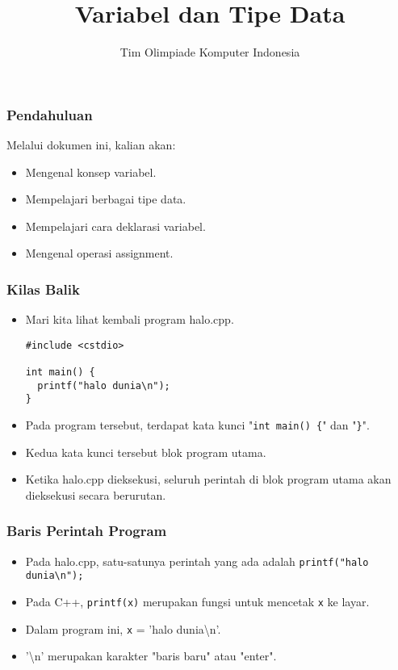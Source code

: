 

\title{Variabel dan Tipe Data}
\author{Tim Olimpiade Komputer Indonesia}
\date{}



\begin{frame}
\titlepage
\end{frame}

\begin{frame}
\frametitle{Pendahuluan}
Melalui dokumen ini, kalian akan:
\begin{itemize}
  \item Mengenal konsep variabel.
  \item Mempelajari berbagai tipe data.
  \item Mempelajari cara deklarasi variabel.
  \item Mengenal operasi assignment.
\end{itemize}
\end{frame}

\begin{frame}[fragile]
\frametitle{Kilas Balik}
\begin{itemize}
  \item Mari kita lihat kembali program halo.cpp.
  \begin{lstlisting}
#include <cstdio>

int main() {
  printf("halo dunia\n");
}\end{lstlisting}
  \item Pada program tersebut, terdapat kata kunci "\texttt{int main() \{}" dan "\texttt{\}}".
  \item Kedua kata kunci tersebut blok program utama.
  \item Ketika halo.cpp dieksekusi, seluruh perintah di blok program utama akan dieksekusi secara berurutan.
\end{itemize}
\end{frame}

\begin{frame}
\frametitle{Baris Perintah Program}
\begin{itemize}
  \item Pada halo.cpp, satu-satunya perintah yang ada adalah \texttt{printf("halo dunia\textbackslash n");}
  \item Pada C++, \texttt{printf(x)} merupakan fungsi untuk mencetak \texttt{x} ke layar. 
  \item Dalam program ini, \texttt{x} = 'halo dunia\textbackslash n'.
  \item '\textbackslash n' merupakan karakter "baris baru" atau "enter".
\end{itemize}
\end{frame}

